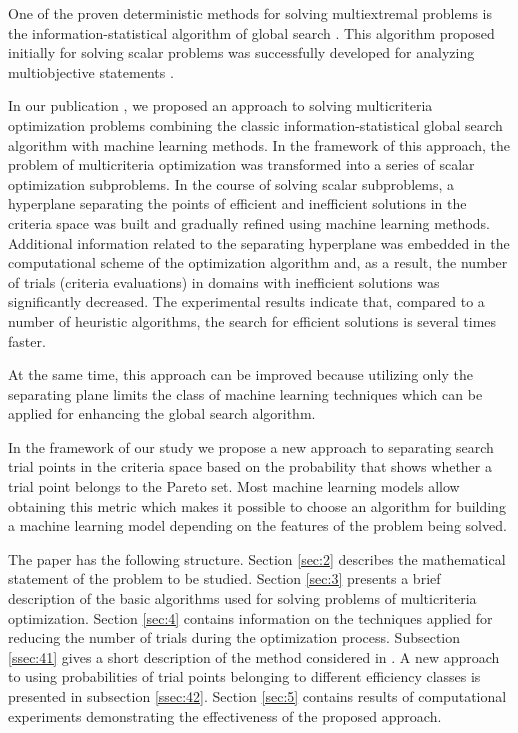 \documentclass[runningheads]{llncs}
\begin{document}
One of the proven deterministic methods for solving multiextremal problems is the information-statistical algorithm of global search \cite{Strongin2000,Sergeyev2013}. This algorithm proposed initially for solving scalar problems was successfully developed for analyzing multiobjective statements \cite{ML_MCO_2023,Gergel2018,GergelKozinov2020}.

In our publication \cite{ML_MCO_2023}, we proposed an approach to solving multicriteria optimization problems combining the classic information-statistical global search algorithm with machine learning methods. In the framework of this approach, the problem of multicriteria optimization was transformed into a series of scalar optimization subproblems. In the course of solving scalar subproblems, a hyperplane separating the points of efficient and inefficient solutions in the criteria space was built and gradually refined using machine learning methods.  Additional information related to the separating hyperplane was embedded in the computational scheme of the optimization algorithm and, as a result, the number of trials (criteria evaluations) in domains with inefficient solutions was significantly decreased. The experimental results indicate that, compared to a number of heuristic algorithms, the search for efficient solutions is several times faster.

At the same time, this approach can be improved because utilizing only the separating plane limits the class of machine learning techniques which can be applied for enhancing the global search algorithm.

In the framework of our study we propose a new approach to separating search trial points in the criteria space based on the probability that shows whether a trial point belongs to the Pareto set. Most machine learning models allow obtaining this metric which makes it possible to choose an algorithm for building a machine learning model depending on the features of the problem being solved.

The paper has the following structure. Section \ref{sec:2} describes the mathematical statement of the problem to be studied. Section \ref{sec:3} presents a brief description of the basic algorithms used for solving problems of multicriteria optimization. Section \ref{sec:4} contains information on the techniques applied for reducing the number of trials during the optimization process. Subsection \ref{ssec:41} gives a short description of the method considered in \cite{ML_MCO_2023}. A new approach to using probabilities of trial points belonging to different efficiency classes is presented in subsection \ref{ssec:42}. Section \ref{sec:5} contains results of computational experiments demonstrating the effectiveness of the proposed approach.
\end{document}
